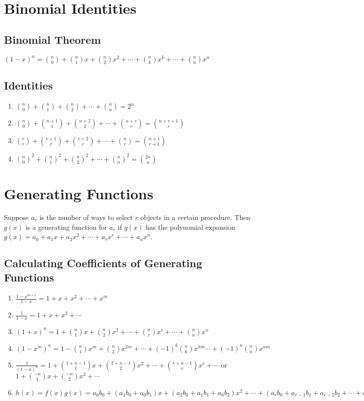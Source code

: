 \documentclass{article}
\begin{document}
\section{Binomial Identities}
\subsection{Binomial Theorem}
$(1-x)^n={n \choose 0}+ {n \choose 1}x+{n \choose 2}x^2+\cdots+{n
\choose k}x^k + \cdots + {n \choose n}x^n$

\subsection{Identities}
\begin{enumerate}
\item ${n \choose 0} + {n \choose 1} + {n \choose 2} + \cdots + {n
\choose n} = 2^n$
\item ${n \choose 0} + {n+1 \choose 1} + {n+2 \choose 2} + \cdots + {n+r
\choose r} = {n+r+1 \choose r}$
\item ${r \choose r} + {r+1 \choose r} + {r+2 \choose r} + \cdots + {n
\choose r} = {n+1 \choose r+1}$
\item ${n \choose 0}^2 + {n \choose 1}^2 + {n \choose 2}^2 + \cdots + {n
\choose n}^2 = {2n \choose n}$
\end{enumerate}

\section{Generating Functions} %
Suppose $a_r$ is the number of ways to select $r$ objects in a certain procedure. Then $g(x)$ is a generating function for $a_r$ if $g(x)$ has the polynomial expansion $g(x) = a_0 + a_1 x + a_2 x^2 + \cdots + a_r x^r + \cdots + a_n x^n$.
\subsection{Calculating Coefficients of Generating Functions} %

\begin{enumerate}
  \item $\frac{1-x^{m+1}}{1-x} = 1 + x + x^2 + \cdots + x^m$
  \item $\frac{1}{1-x}=1+x+x^2+\cdots$
  \item $(1+x)^n = 1 + {n \choose 1} x + {n \choose 2} x^2 + \cdots + {n \choose r}x^r + \cdots + {n \choose n} x^n$
  \item $(1-x^m)^n = 1- {n \choose 1} x^m + {n \choose 2} x^{2m} + \cdots + (-1)^k {n \choose k} x^{km}  \cdots + (-1)^n {n \choose n}x^{nm}$
  \item $\frac{1}{(1-x)^n} = 1 + {1+n-1 \choose 1}x + {2+n-1 \choose 2}x^2 + \cdots + {r+n-1 \choose r}x^r + \cdots$ or $1 + {-n \choose 1}x + {-n \choose 2}x^2 + \cdots$
  \item $h(x) = f(x)g(x) = a_0b_0 + (a_1 b_0+a_0 b_1)x + (a_2 b_0 + a_1 b_1 + a_0 b_2)x^2 + \cdots + (a_r b_0 + a_{r-1} b_1 + a_{r-2} b_2 + \cdots + a_0b_r)x^r+\cdots$
\end{enumerate}
\end{document}
